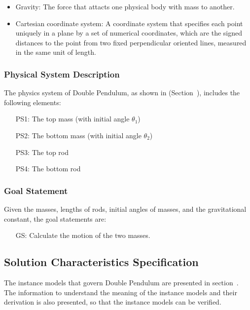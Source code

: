 \documentclass[12pt]{article}
\newcounter{goalnum} %
\begin{document}
\begin{itemize}

\item Gravity: The force that attacts one physical body with mass to another.  
\item Cartesian coordinate system: A coordinate system that specifies each point uniquely in a plane by a set of numerical coordinates, which are the signed distances to the point from two fixed perpendicular oriented lines, measured in the same unit of length. 

\end{itemize}


\subsubsection{Physical System Description}\label{sec_physicsSysDes}
The physics system of Double Pendulum, as shown in (Section~), includes the following elements:
\begin{itemize}

\item[PS1:] The top mass (with initial angle $\theta_1$)
\item[PS2:] The bottom mass (with initial angle $\theta_2$)
\item[PS3:] The top rod
\item[PS4:] The bottom rod

\end{itemize}

\subsubsection{Goal Statement}\label{sec_goalState}
Given the masses, lengths of rods, initial angles of masses, and the gravitational constant, the goal statements are:
\begin{itemize}

\item[GS\refstepcounter{goalnum}\thegoalnum \label{G_goal1}:] Calculate the motion of the two masses.
\end{itemize}

\subsection{Solution Characteristics Specification}\label{sec_solotionSpec}
The instance models that govern Double Pendulum are presented in section~. The information to understand the meaning of the instance models and their derivation is also presented, so that the instance models can be verified. 
\end{document}
